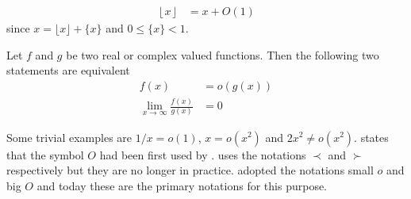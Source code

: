 \documentclass[elemannt.tex]{subfile}
\begin{document}
		\begin{align*}
			\left\lfloor{x}\right\rfloor
				& = x+O(1)
		\end{align*}
	since $x=\lfloor{x}\rfloor+\{x\}$ and $0\leq \{x\}<1$.
		\begin{definition}[Small O]
			Let $f$ and $g$ be two real or complex valued functions. Then the following two statements are equivalent
				\begin{align}
					f(x)
						& = o(g(x))\\
					\lim\limits_{x\to\infty}\frac{f(x)}{g(x)}
						& = 0
				\end{align}
		\end{definition}
	Some trivial examples are $1/x=o(1)$, $x=o(x^{2})$ and $2x^{2}\neq o(x^{2})$.  \textcite[Page 883 (second volume is paged consecutively after first volume)]{landau_1909} states that the symbol $O$ had been first used by \textcite[Page 401]{bachmann_1894}. \textcite{hardy_1910} uses the notations $\prec$ and $\succ$ respectively but they are no longer in practice. \textcite{hardy_riesz_1915} adopted the notations small $o$ and big $O$ and today these are the primary notations for this purpose.
\end{document}
